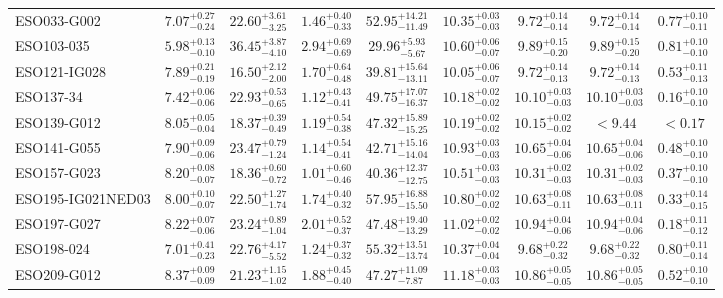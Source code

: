 \documentclass[onecolumn]{mn2e}
\begin{document}
{\begin{center}
\begin{longtable}{lcccccccc}
ESO033-G002 & $7.07_{-0.24}^{+0.27}$ & $22.60_{-3.25}^{+3.61}$ & $1.46_{-0.33}^{+0.40}$ &$52.95_{-11.49}^{+14.21}$ & $10.35_{-0.03}^{+0.03}$ & $9.72_{-0.14}^{+0.14}$ & $9.72_{-0.14}^{+0.14}$ & $0.77_{-0.11}^{+0.10}$ \\
ESO103-035 & $5.98_{-0.10}^{+0.13}$ & $36.45_{-4.10}^{+3.87}$ & $2.94_{-0.69}^{+0.69}$ &$29.96_{-5.67}^{+5.93}$ & $10.60_{-0.07}^{+0.06}$ & $9.89_{-0.20}^{+0.15}$ & $9.89_{-0.20}^{+0.15}$ & $0.81_{-0.10}^{+0.10}$ \\
ESO121-IG028 & $7.89_{-0.19}^{+0.21}$ & $16.50_{-2.00}^{+2.12}$ & $1.70_{-0.48}^{+0.64}$ &$39.81_{-13.11}^{+15.64}$ & $10.05_{-0.07}^{+0.06}$ & $9.72_{-0.13}^{+0.14}$ & $9.72_{-0.13}^{+0.14}$ & $0.53_{-0.13}^{+0.11}$ \\
ESO137-34 & $7.42_{-0.06}^{+0.06}$ & $22.93_{-0.65}^{+0.53}$ & $1.12_{-0.41}^{+0.43}$ &$49.75_{-16.37}^{+17.07}$ & $10.18_{-0.02}^{+0.02}$ & $10.10_{-0.03}^{+0.03}$ & $10.10_{-0.03}^{+0.03}$ & $0.16_{-0.10}^{+0.10}$ \\
ESO139-G012 & $8.05_{-0.04}^{+0.05}$ & $18.37_{-0.49}^{+0.39}$ & $1.19_{-0.38}^{+0.54}$ &$47.32_{-15.25}^{+15.89}$ & $10.19_{-0.02}^{+0.02}$ & $10.15_{-0.02}^{+0.02}$ & $<9.44$ & $<0.17$ \\
ESO141-G055 & $7.90_{-0.06}^{+0.09}$ & $23.47_{-1.24}^{+0.79}$ & $1.14_{-0.41}^{+0.54}$ &$42.71_{-14.04}^{+15.16}$ & $10.93_{-0.03}^{+0.03}$ & $10.65_{-0.06}^{+0.04}$ & $10.65_{-0.06}^{+0.04}$ & $0.48_{-0.10}^{+0.10}$ \\
ESO157-G023 & $8.20_{-0.07}^{+0.08}$ & $18.36_{-0.72}^{+0.60}$ & $1.01_{-0.46}^{+0.60}$ &$40.36_{-12.75}^{+12.37}$ & $10.51_{-0.03}^{+0.03}$ & $10.31_{-0.03}^{+0.02}$ & $10.31_{-0.03}^{+0.02}$ & $0.37_{-0.10}^{+0.10}$ \\
ESO195-IG021NED03 & $8.00_{-0.07}^{+0.10}$ & $22.50_{-1.74}^{+1.27}$ & $1.74_{-0.32}^{+0.40}$ &$57.95_{-15.50}^{+16.88}$ & $10.80_{-0.02}^{+0.02}$ & $10.63_{-0.11}^{+0.08}$ & $10.63_{-0.11}^{+0.08}$ & $0.33_{-0.15}^{+0.14}$ \\
ESO197-G027 & $8.22_{-0.06}^{+0.07}$ & $23.24_{-1.04}^{+0.89}$ & $2.01_{-0.37}^{+0.52}$ &$47.48_{-13.29}^{+19.40}$ & $11.02_{-0.02}^{+0.02}$ & $10.94_{-0.06}^{+0.04}$ & $10.94_{-0.06}^{+0.04}$ & $0.18_{-0.12}^{+0.11}$ \\
ESO198-024 & $7.01_{-0.23}^{+0.41}$ & $22.76_{-5.52}^{+4.17}$ & $1.24_{-0.32}^{+0.37}$ &$55.32_{-13.74}^{+13.51}$ & $10.37_{-0.04}^{+0.04}$ & $9.68_{-0.32}^{+0.22}$ & $9.68_{-0.32}^{+0.22}$ & $0.80_{-0.14}^{+0.11}$ \\
ESO209-G012 & $8.37_{-0.09}^{+0.09}$ & $21.23_{-1.02}^{+1.15}$ & $1.88_{-0.40}^{+0.45}$ &$47.27_{-7.87}^{+11.09}$ & $11.18_{-0.03}^{+0.03}$ & $10.86_{-0.05}^{+0.05}$ & $10.86_{-0.05}^{+0.05}$ & $0.52_{-0.10}^{+0.10}$ \\

\end{longtable}
\end{center}}
\end{document}
